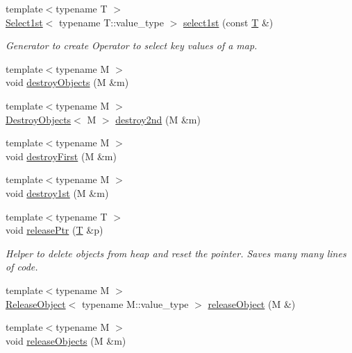 \begin{DoxyCompactItemize}
{\footnotesize template$<$typename T $>$ }\\\hyperlink{class_d_d4hep_1_1_select1st}{Select1st}$<$ typename T::value\_\-type $>$ \hyperlink{namespace_d_d4hep_a356dc9dc533d859f74bd2d5816e39357}{select1st} (const \hyperlink{class_t}{T} \&)
\begin{DoxyCompactList}\small\item\em Generator to create Operator to select key values of a map. \item\end{DoxyCompactList}\item 
{\footnotesize template$<$typename M $>$ }\\void \hyperlink{namespace_d_d4hep_af315e60d3775e6d538af26f0506d3cd4}{destroyObjects} (M \&m)
\item 
{\footnotesize template$<$typename M $>$ }\\\hyperlink{class_d_d4hep_1_1_destroy_objects}{DestroyObjects}$<$ M $>$ \hyperlink{namespace_d_d4hep_ab064c9ee174e787548e74ba743d9fb77}{destroy2nd} (M \&m)
\item 
{\footnotesize template$<$typename M $>$ }\\void \hyperlink{namespace_d_d4hep_af45dd8d71ae6623d0023b837a0108aac}{destroyFirst} (M \&m)
\item 
{\footnotesize template$<$typename M $>$ }\\void \hyperlink{namespace_d_d4hep_abc92ec3a17763a2b4cf06ab0ce96d803}{destroy1st} (M \&m)
\item 
{\footnotesize template$<$typename T $>$ }\\void \hyperlink{namespace_d_d4hep_a330e1e3e191c07da4ffcb6e698f28cda}{releasePtr} (\hyperlink{class_t}{T} \&p)
\begin{DoxyCompactList}\small\item\em Helper to delete objects from heap and reset the pointer. Saves many many lines of code. \item\end{DoxyCompactList}\item 
{\footnotesize template$<$typename M $>$ }\\\hyperlink{class_d_d4hep_1_1_release_object}{ReleaseObject}$<$ typename M::value\_\-type $>$ \hyperlink{namespace_d_d4hep_a83f518b3da47a2f0c4a65b48ed459578}{releaseObject} (M \&)
\item 
{\footnotesize template$<$typename M $>$ }\\void \hyperlink{namespace_d_d4hep_a069d5802981cb52e1e4981aabd8157e2}{releaseObjects} (M \&m)

\end{DoxyCompactItemize}
